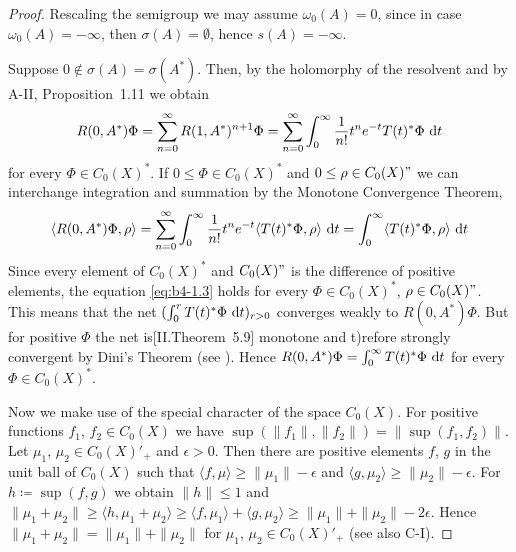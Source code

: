\begin{proof}
Rescaling the semigroup we may assume $\omega_{0}(A) = 0$, 
since in case $\omega_{0}(A) = -\infty$, then $\sigma(A) = \emptyset$, hence $s(A) = -\infty$.

Suppose $0 \notin \sigma(A) = \sigma(A^*)$. 
Then, by the holomorphy of the resolvent and by A-II, Proposition~1.11 we obtain
\[
   R(0,A^*)\Phi = \sum_{n=0}^{\infty} R(1,A^*)^{n+1}\Phi = \sum_{n=0}^{\infty} \int_0^{\infty} \frac{1}{n!} t^n e^{-t}T(t)^*\Phi \, \mathop{}\!\mathrm{d}{t}
\]  
 for every  $\Phi \in C_{0}(X)^*$. 
 If $0 \leq \Phi \in C_{0}(X)^*$ and $0 \leq \rho \in C_{0}(X)"$ we can interchange integration and summation by the Monotone Convergence Theorem, \ie
\begin{equation}\label{eq:b4-1.3}
   \langle R(0,A^*)\Phi,\rho \rangle = \sum_{n=0}^{\infty} \int_0^{\infty} \frac{1}{n!} t^n e^{-t}\langle T(t)^*\Phi,\rho \rangle \, \mathop{}\!\mathrm{d}{t} = \int_0^{\infty} \langle T(t)^*\Phi,\rho \rangle \, \mathop{}\!\mathrm{d}{t}
\end{equation}
Since every element of $C_{0}(X)^*$ and $C_{0}(X)"$ is the difference of positive
elements, the equation \eqref{eq:b4-1.3} holds for every $\Phi \in C_{0}(X)^*$, $\rho \in C_{0}(X)"$. 
This means that the net $(\int_0^r T(t)^*\Phi \, \mathop{}\!\mathrm{d}{t})_{r > 0}$ converges weakly to $R(0,A^*)\Phi$. 
But for positive $\Phi$ the net is[II.Theorem~5.9] monotone and t)refore strongly convergent by Dini's Theorem (see \citet[II.Theorem~5.9]{schaefer:1974}). 
Hence $R(0,A^*)\Phi = \int_0^{\infty} T(t)^*\Phi \, \mathop{}\!\mathrm{d}{t}$ for every $\Phi \in C_{0}(X)^*$.

Now we make use of the special character of the space $C_{0}(X)$. 
For positive functions $f_1$, $f_2 \in C_{0}(X)$ we have $\sup(\|f_1\|,\|f_2\|) = \|\sup(f_1,f_2)\|$. 
Let $\mu_1$, $\mu_2 \in C_{0}(X)'_+$ and $\epsilon  >  0$. 
Then there are positive elements $f$, $g$ in the unit ball of $C_{0}(X)$ such that $\langle f,\mu \rangle \geq \|\mu_1\| - \epsilon$ and $\langle g,\mu_2 \rangle \geq \|\mu_2\| - \epsilon$. 
For $h \coloneq \sup(f,g)$ we obtain $\|h\| \leq 1$ and $\|\mu_1 + \mu_2\| \geq \langle h,\mu_1 + \mu_2 \rangle \geq \langle f,\mu_1 \rangle + \langle g,\mu_2 \rangle \geq \|\mu_1\| + \|\mu_2\| - 2\epsilon$.
Hence $\|\mu_1 + \mu_2\| = \|\mu_1\| + \|\mu_2\|$ for $\mu_1$, $\mu_2 \in C_{0}(X)'_+$ (see also C-I).


\end{proof}
